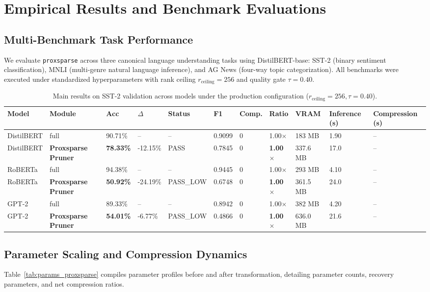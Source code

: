 \section{Empirical Results and Benchmark Evaluations}
\label{sec:results}

\subsection{Multi-Benchmark Task Performance}
We evaluate \texttt{proxsparse} across three canonical language understanding tasks using DistilBERT-base: SST-2 (binary sentiment classification), MNLI (multi-genre natural language inference), and AG News (four-way topic categorization). All benchmarks were executed under standardized hyperparameters with rank ceiling $r_{\mathrm{ceiling}} = 256$ and quality gate $\tau = 0.40$.

\begin{table}[t]
\centering
\small
\begin{tabular}{lllllllllll}
\toprule
\textbf{Model} & \textbf{Module} & \textbf{Acc} & \textbf{$\Delta$} & \textbf{Status} & \textbf{F1} & \textbf{Comp.} & \textbf{Ratio} & \textbf{VRAM} & \textbf{Inference (s)} & \textbf{Compression (s)} \\
\midrule
DistilBERT & full & 90.71\% & -- & -- & 0.9099 & 0 & 1.00$\times$ & 183 MB & 1.90 & -- \\
DistilBERT & \textbf{Proxsparse Pruner} & \textbf{78.33\%} & -12.15\% & PASS & 0.7845 & 0 & \textbf{1.00$\times$} & 337.6 MB & 17.0 & -- \\
RoBERTa & full & 94.38\% & -- & -- & 0.9445 & 0 & 1.00$\times$ & 293 MB & 4.10 & -- \\
RoBERTa & \textbf{Proxsparse Pruner} & \textbf{50.92\%} & -24.19\% & PASS\_LOW & 0.6748 & 0 & \textbf{1.00$\times$} & 361.5 MB & 24.0 & -- \\
GPT-2 & full & 89.33\% & -- & -- & 0.8942 & 0 & 1.00$\times$ & 382 MB & 4.20 & -- \\
GPT-2 & \textbf{Proxsparse Pruner} & \textbf{54.01\%} & -6.77\% & PASS\_LOW & 0.4866 & 0 & \textbf{1.00$\times$} & 636.0 MB & 21.6 & -- \\
\bottomrule
\end{tabular}
\caption{Main results on SST-2 validation across models under the production configuration ($r_{\mathrm{ceiling}}=256, \tau=0.40$).}
\label{tab:main_sst2}
\end{table}

\subsection{Parameter Scaling and Compression Dynamics}
Table~\ref{tab:params_proxsparse} compiles parameter profiles before and after transformation, detailing parameter counts, recovery parameters, and net compression ratios.

